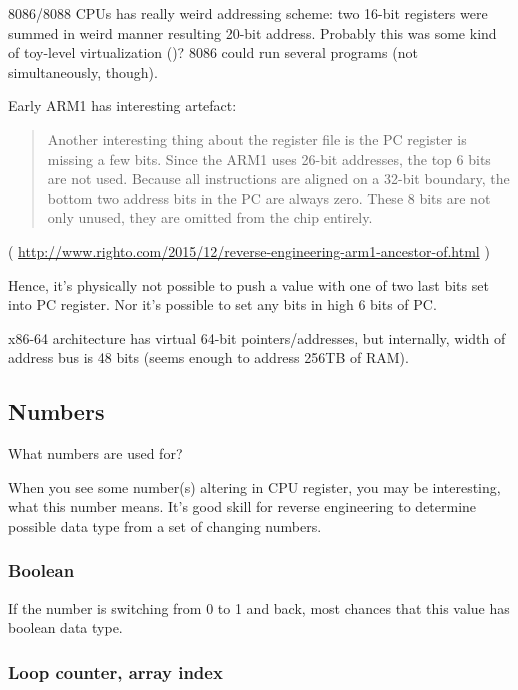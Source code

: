 8086/8088 CPUs has really weird addressing scheme:
two 16-bit registers were summed in weird manner resulting 20-bit address.
Probably this was some kind of toy-level virtualization ()?
8086 could run several programs (not simultaneously, though).

Early ARM1 has interesting artefact:

\begin{framed}
\begin{quotation}
Another interesting thing about the register file is the PC register is missing a few bits. Since the ARM1 uses 26-bit addresses, the top 6 bits are not used. Because all instructions are aligned on a 32-bit boundary, the bottom two address bits in the PC are always zero. These 8 bits are not only unused, they are omitted from the chip entirely.
\end{quotation}
\end{framed}

( \url{http://www.righto.com/2015/12/reverse-engineering-arm1-ancestor-of.html} )

Hence, it's physically not possible to push a value with one of two last bits set into PC register.
Nor it's possible to set any bits in high 6 bits of PC.

x86-64 architecture has virtual 64-bit pointers/addresses, but internally, width of address bus is 48 bits
(seems enough to address 256TB of \ac{RAM}).

\subsection{Numbers}

What numbers are used for?

When you see some number(s) altering in CPU register, you may be interesting, what this number means.
It's good skill for reverse engineering to determine possible data type from a set of changing numbers.

\subsubsection{Boolean}

If the number is switching from 0 to 1 and back, most chances that this value has boolean data type.

\subsubsection{Loop counter, array index}

